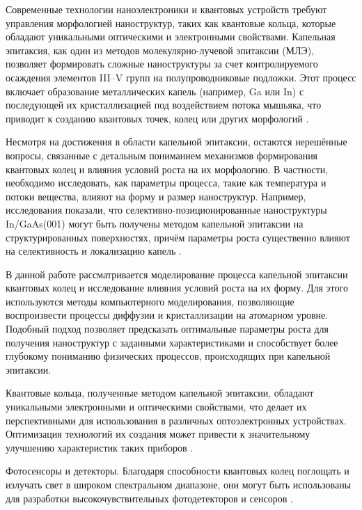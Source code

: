 \documentclass[14pt,oneside]{extarticle}
\begin{document}


\tableofcontents
\pagebreak


Современные технологии наноэлектроники и квантовых устройств требуют управления морфологией наноструктур, таких как квантовые кольца, которые обладают уникальными оптическими и электронными свойствами. Капельная эпитаксия, как один из методов молекулярно-лучевой эпитаксии (МЛЭ), позволяет формировать сложные наноструктуры за счет контролируемого осаждения элементов III–V групп на полупроводниковые подложки. Этот процесс включает образование металлических капель (например, Ga или In) с последующей их кристаллизацией под воздействием потока мышьяка, что приводит к созданию квантовых точек, колец или других морфологий \cite{balakirev1}.

Несмотря на достижения в области капельной эпитаксии, остаются нерешённые вопросы, связанные с детальным пониманием механизмов формирования квантовых колец и влияния условий роста на их морфологию. В частности, необходимо исследовать, как параметры процесса, такие как температура и потоки вещества, влияют на форму и размер наноструктур. Например, исследования показали, что селективно-позиционированные наноструктуры In/GaAs(001) могут быть получены методом капельной эпитаксии на структурированных поверхностях, причём параметры роста существенно влияют на селективность и локализацию капель \cite{balakirev2}.

В данной работе рассматривается моделирование процесса капельной эпитаксии квантовых колец и исследование влияния условий роста на их форму. Для этого используются методы компьютерного моделирования, позволяющие воспроизвести процессы диффузии и кристаллизации на атомарном уровне. Подобный подход позволяет предсказать оптимальные параметры роста для получения наноструктур с заданными характеристиками и способствует более глубокому пониманию физических процессов, происходящих при капельной эпитаксии.

Квантовые кольца, полученные методом капельной эпитаксии, обладают уникальными электронными и оптическими свойствами, что делает их перспективными для использования в различных оптоэлектронных устройствах. Оптимизация технологий их создания может привести к значительному улучшению характеристик таких приборов \cite{gurioli1}.

Фотосенсоры и детекторы. Благодаря способности квантовых колец поглощать и излучать свет в широком спектральном диапазоне, они могут быть использованы для разработки высокочувствительных фотодетекторов и сенсоров \cite{ponomarenko1}. 
\end{document}
